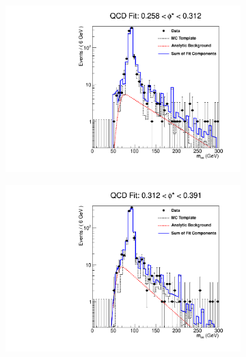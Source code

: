\begin{figure}[!htbp]
    \centering
    \begin{subfigure}[b]{\SideBySidePlotWidth}
        \includegraphics[width=\linewidth]{figures/qcd_fits/qcd_fit_plot_for_25.pdf}
        \label{fig:qcd_fit_25}
    \end{subfigure}%
    \begin{subfigure}[b]{\SideBySidePlotWidth}
        \includegraphics[width=\linewidth]{figures/qcd_fits/qcd_fit_plot_for_26.pdf}
        \label{fig:qcd_fit_26}
    \end{subfigure}
    \begin{subfigure}[b]{\SideBySidePlotWidth}

\end{subfigure}
\end{figure}
